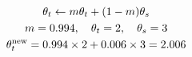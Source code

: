 \documentclass[border=7pt]{standalone}
\begin{document}
\color{ink}
$\displaystyle \begin{gathered}
\theta_t\leftarrow m\theta_t+(1-m)\theta_s\\
m=0.994,\quad\theta_t=2,\quad\theta_s=3\\
\theta_t^{\rm new}=0.994\times2+0.006\times3=2.006
\end{gathered}$
\end{document}
